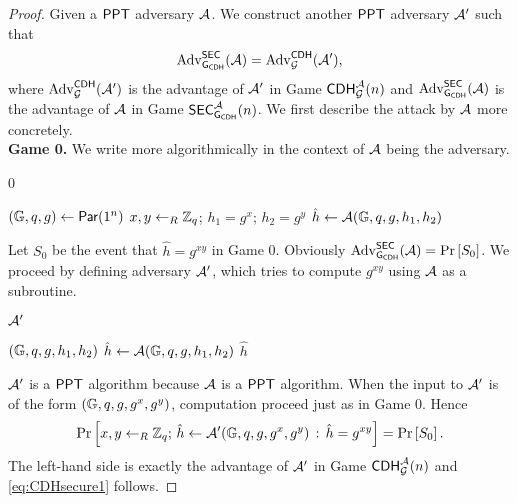 \begin{proof}
Given a $\mathsf{PPT}$ adversary $\mathcal{A}$. We construct another $\mathsf{PPT}$ adversary $\mathcal{A}'$ such that
\begin{align}
\label{eq:CDHsecure1}
	\operatorname{Adv}_{\operatorname{\mathsf{G}}_{\mathsf{CDH}}}^{\mathsf{SEC}}(\mathcal{A}) = \operatorname{Adv}_{\operatorname{\mathcal{G}}}^{\mathsf{CDH}}(\mathcal{A}'),
\end{align}
where $\operatorname{Adv}_{\operatorname{\mathcal{G}}}^{\mathsf{CDH}}(\mathcal{A}')$ is the advantage of $\mathcal{A}'$ in Game $\mathsf{CDH}_{\operatorname{\mathcal{G}}}^{\mathcal{A}}(n)$ and $\operatorname{Adv}_{\operatorname{\mathsf{G}}_{\mathsf{CDH}}}^{\mathsf{SEC}}(\mathcal{A})$ is the advantage of $\mathcal{A}$ in Game $\mathsf{SEC}_{\operatorname{\mathsf{G}}_{\mathsf{CDH}}}^{\mathcal{A}}(n)$. We first describe the attack by $\mathcal{A}$ more concretely. \\

\noindent\textbf{Game 0.} We write  more algorithmically in the context of $\mathcal{A}$ being the adversary.

\vspace*{-.3cm}
\begin{Algorithm}[]{6cm}
\captionGame
\caption{0}
\label{alg:CDHsecure1}
\begin{algorithmic}[1]
\State $(\mathbb{G},q,g)\leftarrow\operatorname{\mathsf{Par}}(1^n)$  
\State $x,y\leftarrow_R\mathbb{Z}_q$; $h_1=g^x$; $h_2=g^y$
\State $\hat{h}\leftarrow\mathcal{A}(\mathbb{G},q,g,h_1,h_2)$
\end{algorithmic}
\end{Algorithm}

Let $S_0$ be the event that $\hat{h} = g^{xy}$ in Game 0. Obviously $\operatorname{Adv}_{\operatorname{\mathsf{G}}_{\mathsf{CDH}}}^{\mathsf{SEC}}(\mathcal{A})=\operatorname{Pr}\left[{S_0}\right]$. We proceed by defining adversary $\mathcal{A}'$, which tries to compute $g^{xy}$ using $\mathcal{A}$ as a subroutine.

\vspace*{-.3cm}
\begin{Algorithm}[]{6cm}
\captionAdversary
\caption{$\mathcal{A}'$}
\label{alg:CDHsecure2}
\begin{algorithmic}[1]
\Require $(\mathbb{G},q,g,h_1,h_2)$  
\State $\hat{h}\leftarrow\mathcal{A}(\mathbb{G},q,g,h_1,h_2)$
\State \Ret $\hat{h}$
\end{algorithmic}
\end{Algorithm}

$\mathcal{A}'$ is a $\mathsf{PPT}$ algorithm because $\mathcal{A}$ is a $\mathsf{PPT}$ algorithm. When the input to $\mathcal{A}'$ is of the form $(\mathbb{G},q,g,g^x,g^y)$, computation proceed just as in Game 0. Hence
\begin{align*}
	\operatorname{Pr}\left[{x,y\leftarrow_R\mathbb{Z}_q;\, \hat{h}\leftarrow\mathcal{A}'(\mathbb{G},q,g,g^x,g^y)\, :\, \hat{h}=g^{xy}}\right]=\operatorname{Pr}\left[{S_0}\right].
\end{align*}
The left-hand side is exactly the advantage of $\mathcal{A}'$ in Game $\mathsf{CDH}_{\operatorname{\mathcal{G}}}^{\mathcal{A}}(n)$ and \ref{eq:CDHsecure1} follows.
\end{proof}

